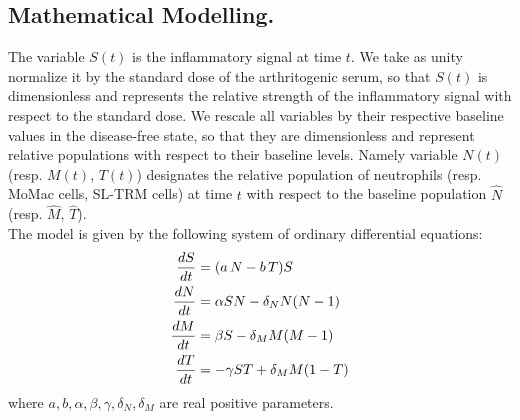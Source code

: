 \documentclass[a4paper, 12pt]{article}
\providecommand{\DIFaddtex}[1]{{\protect\color{blue} \sf #1}} %
\providecommand{\DIFdeltex}[1]{{\protect\color{red} \scriptsize #1}} %
\providecommand{\DIFaddbegin}{} %
\providecommand{\DIFaddend}{} %
\providecommand{\DIFdelbegin}{} %
\providecommand{\DIFdelend}{} %
\providecommand{\DIFadd}[1]{\texorpdfstring{\DIFaddtex{#1}}{#1}} %
\providecommand{\DIFdel}[1]{\texorpdfstring{\DIFdeltex{#1}}{}} %
\begin{document}
\subsection{Mathematical Modelling.}
The variable $S(t)$ is the inflammatory signal at time $t$. We \DIFdelbegin \DIFdel{take as unity }\DIFdelend \DIFaddbegin \DIFadd{normalize it by }\DIFaddend the standard dose of the arthritogenic serum, so that $S(t)$ is dimensionless and represents the relative strength of the inflammatory signal with respect to the standard dose.
We rescale all variables by their respective baseline values in the disease-free state, so that they are dimensionless and represent relative populations with respect to their baseline levels.
Namely variable $N(t)$ (resp. $M(t)$, $T(t)$) designates the relative population of neutrophils (resp. MoMac cells, SL-TRM cells) at time $t$ with respect to the baseline population $\widehat{N}$ (resp. $\widehat{M}$, $\widehat{T}$).\\
The model is given by the following system of ordinary differential equations:
\begin{subequations}\label{eq:system}
\renewcommand{\theequation}{\theparentequation.\arabic{equation}}
\begin{align}
\frac{dS}{dt} &= (a\, N - b\,T) S \label{eq:system:S}\\
\frac{dN}{dt} &= \alpha S N - \delta_N N (N-1) \label{eq:system:N}\\
\frac{dM}{dt} &= \beta S - \delta_M M (M-1) \label{eq:system:M}\\
\frac{dT}{dt} &= -\gamma S T + \delta_M M (1-T) \label{eq:system:T} 
\end{align}
\end{subequations}
where $a,b,\alpha,\beta,\gamma, \delta_N, \delta_M$ are \DIFaddbegin \DIFadd{real }\DIFaddend positive parameters.
\end{document}
